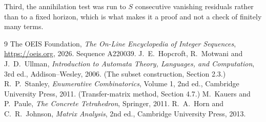\documentclass[11pt,a4paper]{article}
\theoremstyle{plain}
\theoremstyle{definition}
\begin{document}
Third, the annihilation test was run to $S$ consecutive vanishing residuals rather than to a
fixed horizon, which is what makes it a proof and not a check of finitely many terms.

\begin{thebibliography}{9}
 The OEIS Foundation, \emph{The On-Line Encyclopedia of Integer
Sequences}, \url{https://oeis.org}, 2026. Sequence A220039.
 J.~E.~Hopcroft, R.~Motwani and J.~D.~Ullman, \emph{Introduction to Automata
Theory, Languages, and Computation}, 3rd ed., Addison--Wesley, 2006. (The subset
construction, Section 2.3.)
 R.~P.~Stanley, \emph{Enumerative Combinatorics}, Volume 1, 2nd ed.,
Cambridge University Press, 2011. (Transfer-matrix method, Section 4.7.)
 M.~Kauers and P.~Paule, \emph{The Concrete Tetrahedron}, Springer, 2011.
 R.~A.~Horn and C.~R.~Johnson, \emph{Matrix Analysis}, 2nd ed., Cambridge
University Press, 2013.
\end{thebibliography}
\end{document}
